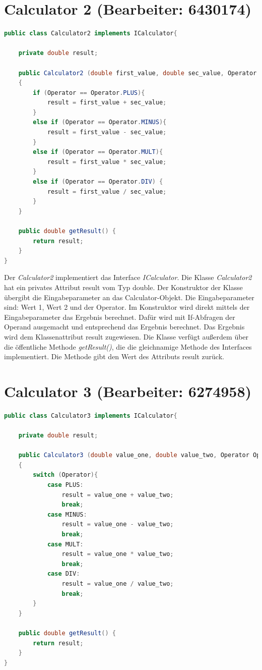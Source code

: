 \chapter{Calculator 2 (Bearbeiter: 6430174)}
\begin{lstlisting}[language=Java,basicstyle=\scriptsize, caption= Calculator 2]
public class Calculator2 implements ICalculator{

    private double result;

    public Calculator2 (double first_value, double sec_value, Operator Operator)
    {
        if (Operator == Operator.PLUS){
            result = first_value + sec_value;
        }
        else if (Operator == Operator.MINUS){
            result = first_value - sec_value;
        }
        else if (Operator == Operator.MULT){
            result = first_value * sec_value;
        }
        else if (Operator == Operator.DIV) {
            result = first_value / sec_value;
        }
    }

    public double getResult() {
        return result;
    }
}
\end{lstlisting}
Der \textit{Calculator2} implementiert das Interface \textit{ICalculator}. Die Klasse \textit{Calculator2} hat ein privates Attribut result vom Typ double. 
Der Konstruktor der Klasse übergibt die Eingabeparameter an das Calculator-Objekt. Die Eingabeparameter sind: Wert 1, Wert 2 und der Operator. Im Konstruktor wird direkt mittels der Eingabeparameter das Ergebnis berechnet. Dafür wird mit If-Abfragen der Operand ausgemacht und entsprechend das Ergebnis berechnet. Das Ergebnis wird dem Klassenattribut result zugewiesen.
Die Klasse verfügt außerdem über die öffentliche Methode \textit{getResult()}, die die gleichnamige Methode des Interfaces implementiert. Die Methode gibt den Wert des Attributs result zurück.

\chapter{Calculator 3 (Bearbeiter: 6274958)}

\begin{lstlisting}[language=Java,basicstyle=\scriptsize, caption= Calculator 3]
public class Calculator3 implements ICalculator{

    private double result;

    public Calculator3 (double value_one, double value_two, Operator Operator)
    {
        switch (Operator){
            case PLUS:
                result = value_one + value_two;
                break;
            case MINUS:
                result = value_one - value_two;
                break;
            case MULT:
                result = value_one * value_two;
                break;
            case DIV:
                result = value_one / value_two;
                break;
        }
    }

    public double getResult() {
        return result;
    }
}
\end{lstlisting}

